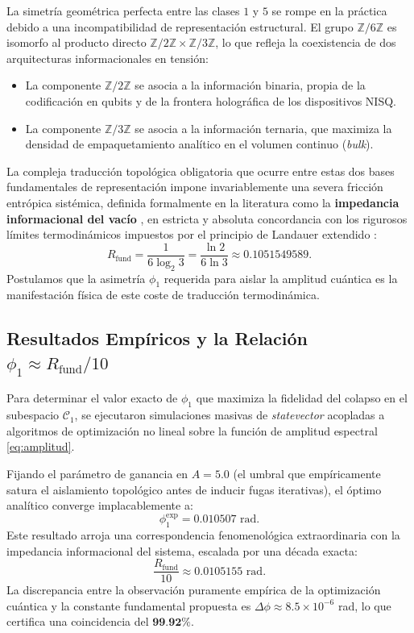 \documentclass[12pt,a4paper]{article}
\theoremstyle{plain}
\theoremstyle{definition}
\theoremstyle{remark}
\begin{document}
La simetría geométrica perfecta entre las clases $1$ y $5$ se rompe en la práctica debido a una incompatibilidad de representación estructural. El grupo $\mathbb{Z}/6\mathbb{Z}$ es isomorfo al producto directo $\mathbb{Z}/2\mathbb{Z} \times \mathbb{Z}/3\mathbb{Z}$, lo que refleja la coexistencia de dos arquitecturas informacionales en tensión:
\begin{itemize}
    \item La componente $\mathbb{Z}/2\mathbb{Z}$ se asocia a la información binaria, propia de la codificación en qubits y de la frontera holográfica de los dispositivos NISQ.
    \item La componente $\mathbb{Z}/3\mathbb{Z}$ se asocia a la información ternaria, que maximiza la densidad de empaquetamiento analítico en el volumen continuo (\textit{bulk}).
\end{itemize}
La compleja traducción topológica obligatoria que ocurre entre estas dos bases fundamentales de representación impone invariablemente una severa fricción entrópica sistémica, definida formalmente en la literatura como la \textbf{impedancia informacional del vacío} \cite{Peinador_Genesis_e_2025}, en estricta y absoluta concordancia con los rigurosos límites termodinámicos impuestos por el principio de Landauer extendido \cite{Landauer1961}:
\begin{equation}
R_{\text{fund}} = \frac{1}{6\log_2 3} = \frac{\ln 2}{6\ln 3} \approx 0.1051549589.
\label{eq:rfund}
\end{equation}
Postulamos que la asimetría $\phi_1$ requerida para aislar la amplitud cuántica es la manifestación física de este coste de traducción termodinámica.

\subsection{Resultados Empíricos y la Relación $\phi_1 \approx R_{\text{fund}}/10$}

Para determinar el valor exacto de $\phi_1$ que maximiza la fidelidad del colapso en el subespacio $\mathcal{C}_1$, se ejecutaron simulaciones masivas de \textit{statevector} acopladas a algoritmos de optimización no lineal sobre la función de amplitud espectral \eqref{eq:amplitud}. 

Fijando el parámetro de ganancia en $A = 5.0$ (el umbral que empíricamente satura el aislamiento topológico antes de inducir fugas iterativas), el óptimo analítico converge implacablemente a:
\begin{equation}
\phi_1^{\text{exp}} = 0.010507 \text{ rad}.
\end{equation}
Este resultado arroja una correspondencia fenomenológica extraordinaria con la impedancia informacional del sistema, escalada por una década exacta:
\begin{equation}
\frac{R_{\text{fund}}}{10} \approx 0.0105155 \text{ rad}.
\end{equation}
La discrepancia entre la observación puramente empírica de la optimización cuántica y la constante fundamental propuesta es $\Delta\phi \approx 8.5 \times 10^{-6}$ rad, lo que certifica una coincidencia del $\textbf{99.92\%}$. 
\end{document}
